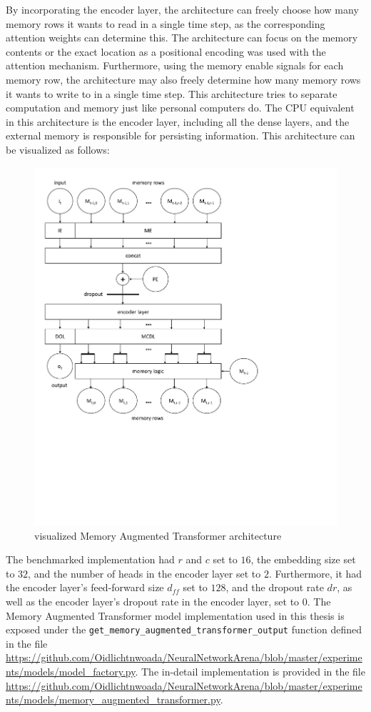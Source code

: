 \documentclass[draft,final]{vutinfth} %
\begin{document}
    By incorporating the encoder layer, the architecture can freely choose how many memory rows it wants to read in a single time step, as the corresponding attention weights can determine this.
    The architecture can focus on the memory contents or the exact location as a positional encoding was used with the attention mechanism.
    Furthermore, using the memory enable signals for each memory row, the architecture may also freely determine how many memory rows it wants to write to in a single time step.
    This architecture tries to separate computation and memory just like personal computers do.
    The CPU equivalent in this architecture is the encoder layer, including all the dense layers, and the external memory is responsible for persisting information.
    This architecture can be visualized as follows:
    \begin{figure}[H]
        \centering{}
        \includegraphics[width=0.8\linewidth,trim={30 320 245 30},clip]{graphics/mat.pdf}
        \caption{visualized Memory Augmented Transformer architecture}
        \label{fig:mat_vis}
    \end{figure}
    The benchmarked implementation had $r$ and $c$ set to $16$, the embedding size set to $32$, and the number of heads in the encoder layer set to $2$. Furthermore, it had the encoder layer's feed-forward size $d_{ff}$ set to $128$, and the dropout rate $dr$, as well as the encoder layer's dropout rate in the encoder layer, set to $0$.
    The Memory Augmented Transformer model implementation used in this thesis is exposed under the \texttt{get\_memory\_augmented\_transformer\_output} function defined in the file \url{https://github.com/Oidlichtnwoada/NeuralNetworkArena/blob/master/experiments/models/model_factory.py}.
    The in-detail implementation is provided in the file \url{https://github.com/Oidlichtnwoada/NeuralNetworkArena/blob/master/experiments/models/memory_augmented_transformer.py}.
\end{document}
